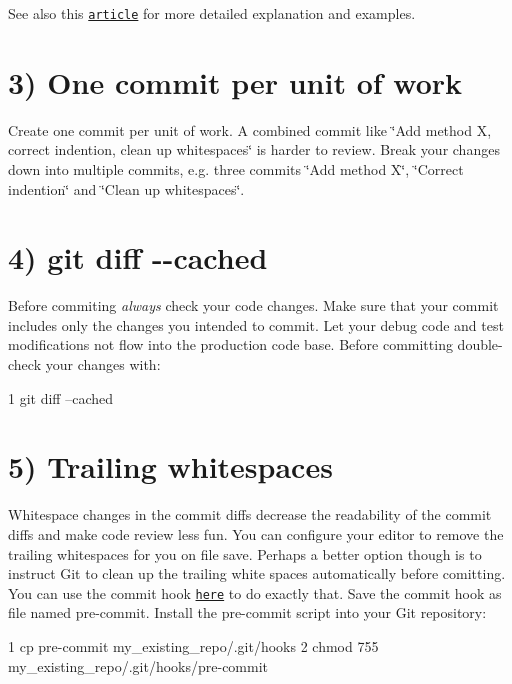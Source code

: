See also this \href{http://chris.beams.io/posts/git-commit/}{\tt article} for more detailed explanation and examples.\hypertarget{git_tips_git_tips_unit}{}\section{3) One commit per unit of work}\label{git_tips_git_tips_unit}
Create one commit per unit of work. A combined commit like \char`\"{}\+Add method X, correct indention, clean up whitespaces\char`\"{} is harder to review. Break your changes down into multiple commits, e.\+g. three commits \char`\"{}\+Add method X\char`\"{}, \char`\"{}\+Correct indention\char`\"{} and \char`\"{}\+Clean up whitespaces\char`\"{}.\hypertarget{git_tips_git_tips_diff}{}\section{4) git diff -\/-\/cached}\label{git_tips_git_tips_diff}
Before commiting {\itshape always} check your code changes. Make sure that your commit includes only the changes you intended to commit. Let your debug code and test modifications not flow into the production code base. Before committing double-\/check your changes with\+: 
\begin{DoxyCode}
1 git diff --cached
\end{DoxyCode}
\hypertarget{git_tips_git_tips_trailing}{}\section{5) Trailing whitespaces}\label{git_tips_git_tips_trailing}
Whitespace changes in the commit diffs decrease the readability of the commit diffs and make code review less fun. You can configure your editor to remove the trailing whitespaces for you on file save. Perhaps a better option though is to instruct Git to clean up the trailing white spaces automatically before comitting. You can use the commit hook \href{http://stackoverflow.com/questions/591923/make-git-automatically-remove-trailing-whitespace-before-committing/3516525#3516525}{\tt here} to do exactly that. Save the commit hook as file named {\ttfamily pre-\/commit}. Install the {\ttfamily pre-\/commit} script into your Git repository\+:


\begin{DoxyCode}
1 cp pre-commit my\_existing\_repo/.git/hooks
2 chmod 755 my\_existing\_repo/.git/hooks/pre-commit
\end{DoxyCode}


